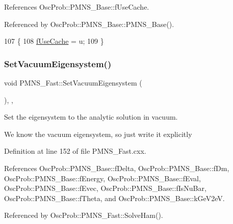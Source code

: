 References Osc\+Prob\+::\+P\+M\+N\+S\+\_\+\+Base\+::f\+Use\+Cache.



Referenced by Osc\+Prob\+::\+P\+M\+N\+S\+\_\+\+Base\+::\+P\+M\+N\+S\+\_\+\+Base().


\begin{DoxyCode}
107 \{
108   \hyperlink{classOscProb_1_1PMNS__Base_ad28c12ef897b5555eda509ea55c99107}{fUseCache} = u; 
109 \}
\end{DoxyCode}
\mbox{\label{classOscProb_1_1PMNS__Fast_a76dd5a761df8689c502b28ad0391f9e2}} 
\subsubsection{\texorpdfstring{Set\+Vacuum\+Eigensystem()}{SetVacuumEigensystem()}}
{\footnotesize\ttfamily void P\+M\+N\+S\+\_\+\+Fast\+::\+Set\+Vacuum\+Eigensystem (\begin{DoxyParamCaption}{ }\end{DoxyParamCaption})\hspace{0.3cm}{\ttfamily [protected]}, {\ttfamily [virtual]}, {\ttfamily [inherited]}}

Set the eigensystem to the analytic solution in vacuum.

We know the vacuum eigensystem, so just write it explicitly 

Definition at line 152 of file P\+M\+N\+S\+\_\+\+Fast.\+cxx.



References Osc\+Prob\+::\+P\+M\+N\+S\+\_\+\+Base\+::f\+Delta, Osc\+Prob\+::\+P\+M\+N\+S\+\_\+\+Base\+::f\+Dm, Osc\+Prob\+::\+P\+M\+N\+S\+\_\+\+Base\+::f\+Energy, Osc\+Prob\+::\+P\+M\+N\+S\+\_\+\+Base\+::f\+Eval, Osc\+Prob\+::\+P\+M\+N\+S\+\_\+\+Base\+::f\+Evec, Osc\+Prob\+::\+P\+M\+N\+S\+\_\+\+Base\+::f\+Is\+Nu\+Bar, Osc\+Prob\+::\+P\+M\+N\+S\+\_\+\+Base\+::f\+Theta, and Osc\+Prob\+::\+P\+M\+N\+S\+\_\+\+Base\+::k\+Ge\+V2eV.



Referenced by Osc\+Prob\+::\+P\+M\+N\+S\+\_\+\+Fast\+::\+Solve\+Ham().


